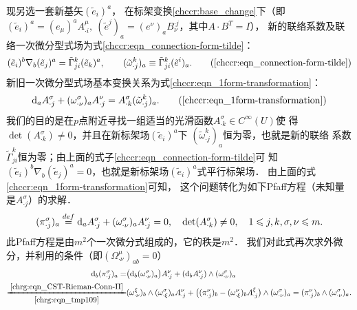 现另选一套新基矢$(\tilde{e}_i)^a$，
在标架变换\eqref{chccr:base_change}下（即$(\tilde{e} _i)^a = (e_\mu)^{a} A_{\cdot i}^{\mu},\
(\tilde{e} ^j)_a = (e^\nu)_{a} B^{\cdot j}_{\nu}$，其中$A\cdot B^T=I$），
新的联络系数及联络一次微分型式场为式\eqref{chccr:eqn_connection-form-tilde}：
\begin{equation}
    (\tilde{e}_i)^b \nabla _b (\tilde{e}_j)^a  =
    \tilde{\Gamma}^{k}_{ji} (\tilde{e}_k)^a,   \qquad
    (\tilde{\omega} _{\cdot j}^{k})_a  \equiv
    \tilde{\Gamma}^{k}_{j i} (\tilde{e}^i)_a .
    \tag{\ref{chccr:eqn_connection-form-tilde}}
\end{equation}
新旧一次微分型式场基本变换关系为式\eqref{chccr:eqn_1form-transformation}：
\begin{equation}
    {\rm d}_a A_{\cdot j}^{\sigma} + (\omega ^{\sigma}_{\cdot\nu})_a  A_{\cdot j}^{\nu}
    =  A_{\cdot k}^{\sigma} (\tilde{\omega} _{\cdot j} ^{k})_a .
    \tag{\ref{chccr:eqn_1form-transformation}}
\end{equation}
我们的目的是在$p$点附近寻找一组适当的光滑函数$A_{\cdot k}^{\sigma}\in C^\infty(U)$使
得$\det(A_{\cdot k}^{\sigma})\neq 0$，并且在新标架场$(\tilde{e}_i)^a$下
$(\tilde{\omega} _{\cdot j} ^{k})_a $恒为零，也就是新的联络
系数$\tilde{\Gamma}^{k}_{j i}$恒为零；由上面的式子\eqref{chccr:eqn_connection-form-tilde}可
知$(\tilde{e}_i)^b \nabla _b (\tilde{e}_j)^a=0$，也就是新标架场$(\tilde{e}_i)^a$式平行标架场．
由上面的式\eqref{chccr:eqn_1form-transformation}可知，
这个问题转化为如下Pfaff方程（未知量是$A_{\cdot j}^{\sigma}$）的求解．
\begin{equation}\label{chrg:eqn_tmp109}
    (\pi _{\cdot j} ^{\sigma})_a \overset{def}{=}
    {\rm d}_a A_{\cdot j}^{\sigma} + (\omega ^{\sigma}_{\cdot\nu})_a  A_{\cdot j}^{\nu}=0,
    \quad \det(A_{\cdot k}^{\sigma})\neq 0,\quad 1 \leqslant j,k,\sigma,\nu \leqslant m .
\end{equation}
此Pfaff方程是由$m^2$个一次微分式组成的，它的秩是$m^2$．
我们对此式再次求外微分，并利用的条件（即$(\Omega_{\cdot \nu} ^{\mu})_{ab}=0$）
\begin{align*}
    {\rm d}_b(\pi _{\cdot j} ^{\sigma})_a =&
       \bigl({\rm d}_b (\omega ^{\sigma}_{\cdot\nu})_a\bigr)  A_{\cdot j}^{\nu}
      + ({\rm d}_b  A_{\cdot j}^{\nu}) \wedge (\omega ^{\sigma}_{\cdot\nu})_a   \\
    \xlongequal[\ref{chrg:eqn_tmp109}]{\ref{chrg:eqn_CST-Rieman-Conn-II}}&
    ( \omega _{\cdot \nu}^\xi )_b \wedge ( \omega _{\cdot \xi}^{\sigma} )_a  A_{\cdot j}^{\nu}
    + \bigl((\pi _{\cdot j} ^{\nu})_b-(\omega ^{\nu}_{\cdot\xi})_b  A_{\cdot j}^{\xi}\bigr)
     \wedge (\omega ^{\sigma}_{\cdot\nu})_a
     =(\pi _{\cdot j} ^{\nu})_b \wedge (\omega ^{\sigma}_{\cdot\nu})_a  .
\end{align*}
